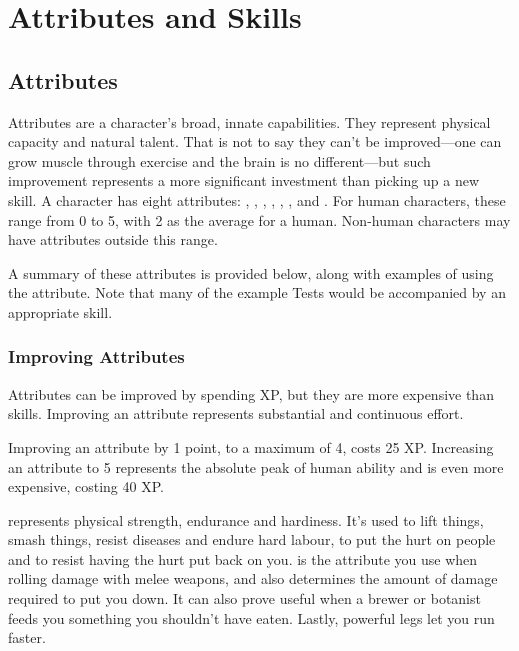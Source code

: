 \chapter{Attributes and Skills}

\section{Attributes}

Attributes are a character's broad, innate capabilities.
They represent physical capacity and natural talent.
That is not to say they can't be improved---one can grow muscle through exercise and the brain is no different---but such improvement represents a more significant investment than picking up a new skill.
A character has eight attributes: , , , , , ,  and .
For human characters, these range from 0 to 5, with 2 as the average for a human.
Non-human characters may have attributes outside this range.

A summary of these attributes is provided below, along with examples of using the attribute.
Note that many of the example Tests would be accompanied by an appropriate skill.

\subsection{Improving Attributes}

Attributes can be improved by spending XP, but they are more expensive than skills.
Improving an attribute represents substantial and continuous effort.

Improving an attribute by 1 point, to a maximum of 4, costs 25 XP.
Increasing an attribute to 5 represents the absolute peak of human ability and is even more expensive, costing 40 XP.


 represents physical strength, endurance and hardiness.
It's used to lift things, smash things, resist diseases and endure hard labour, to put the hurt on people and to resist having the hurt put back on you.
 is the attribute you use when rolling damage with melee weapons, and also determines the amount of damage required to put you down.
It can also prove useful when a brewer or botanist feeds you something you shouldn't have eaten.
Lastly, powerful legs let you run faster.


